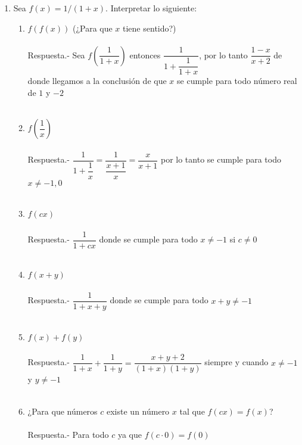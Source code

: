     \begin{enumerate}[\bfseries 1.]

	\item Sea $f(x)=1/(1+x)$. Interpretar lo siguiente:
	    \begin{enumerate}[\bfseries (i)]

		\item $f(f(x))$ (¿Para que $x$ tiene sentido?)\\\\
		Respuesta.- \; Sea $f\left( \dfrac{1}{1+x} \right)$ entonces $\dfrac{1}{1 + \dfrac{1}{1+x}}$, por lo tanto $\dfrac{1-x}{x+2}$ de donde llegamos a la conclusión de que $x$ se cumple para todo número real de $1$ y $-2$\\\\

		\item $f\left( \dfrac{1}{x} \right)$\\\\
		Respuesta.- \; $\dfrac{1}{1 + \dfrac{1}{x}}=\dfrac{1}{\dfrac{x+1}{x}}=\dfrac{x}{x+1}$ por lo tanto se cumple para todo $x\neq -1, 0$\\\\

		\item $f(cx)$\\\\
		Respuesta.- \; $\dfrac{1}{1+cx}$ donde se cumple para todo $x\neq -1$ si $c\neq 0$\\\\

		\item $f(x+y)$\\\\
		Respuesta.- \; $\dfrac{1}{1+x+y}$ donde se cumple para todo $x+y\neq-1$\\\\

		\item $f(x) + f(y)$\\\\
		Respuesta.- \; $\dfrac{1}{1+x} + \dfrac{1}{1+y}=\dfrac{x+y+2}{(1+x)(1+y)}$ siempre y cuando $x\neq-1$ y $y \neq -1$\\\\

		\item ¿Para que números $c$ existe un número $x$ tal que $f(cx)=f(x)$?\\\\
		Respuesta.- \; Para todo $c$ ya que $f(c\cdot 0)=f(0)$\\\\


\end{enumerate}
\end{enumerate}
